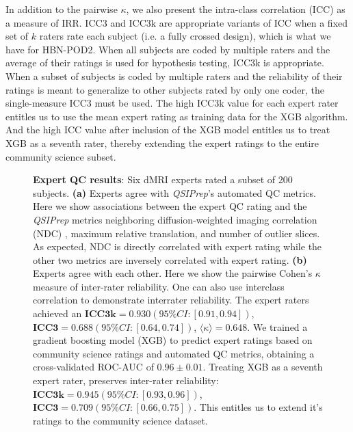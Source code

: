 \documentclass[fleqn,10pt]{wlscirep}
\begin{document}
In addition to the pairwise $\kappa$, we also present the intra-class
correlation (ICC) \cite{hallgren2012-ze} as a measure of IRR.  ICC3 and ICC3k
are appropriate variants of ICC when a fixed set of $k$ raters rate each subject
(i.e. a fully crossed design), which is what we have for HBN-POD2. When all
subjects are coded by multiple raters and the average of their ratings is used
for hypothesis testing, ICC3k is appropriate.  When a subset of subjects is
coded by multiple raters and the reliability of their ratings is meant to
generalize to other subjects rated by only one coder, the single-measure ICC3
must be used. The high ICC3k value for each expert rater entitles us to use the
mean expert rating as training data for the XGB algorithm.  And the high ICC
value after inclusion of the XGB model entitles us to treat XGB as a seventh
rater, thereby extending the expert ratings to the entire community science
subset.

\begin{figure}[ht]
    \begin{subfigure}{.5\textwidth}
    \centering
    \caption{}
    \label{fig:expert-qc:scatter}
    \end{subfigure}
    \begin{subfigure}{.5\textwidth}
    \centering
    \caption{}
    \label{fig:expert-qc:irr}
    \end{subfigure}
    \caption{%
        {\bf Expert QC results}:
        Six dMRI experts rated a subset of \num{200} subjects.
        \textbf{(a)} Experts agree with \emph{QSIPrep}'s automated QC metrics.
        Here we show associations between the expert QC rating and the
        \emph{QSIPrep} metrics neighboring diffusion-weighted imaging
        correlation (NDC) \cite{yeh2019-kb}, maximum relative translation, and
        number of outlier slices. As expected, NDC is directly correlated with expert rating while
        the other two metrics are inversely correlated with expert rating.
        \textbf{(b)} Experts agree with each other. Here we show the pairwise
        Cohen's $\kappa$ measure of inter-rater reliability.  One can also use
        interclass correlation to demonstrate interrater reliability. The expert
        raters achieved an $\textbf{ICC3k} = 0.930 (95\% CI: [0.91, 0.94])$,
        $\textbf{ICC3} = 0.688 (95\% CI: [0.64, 0.74])$, $\langle \kappa \rangle
        = 0.648$.  We trained a gradient boosting model (XGB) to predict expert
        ratings based on community science ratings and automated QC metrics,
        obtaining a cross-validated ROC-AUC of $0.96 \pm 0.01$. Treating
        XGB as a seventh expert rater, preserves inter-rater reliability:
        $\textbf{ICC3k} = 0.945 (95\% CI: [0.93, 0.96])$, $\textbf{ICC3} = 0.709
        (95\% CI: [0.66, 0.75])$.  This entitles us to extend it's ratings to
        the community science dataset.
    }
    \label{fig:expert-qc}
\end{figure}
\end{document}
